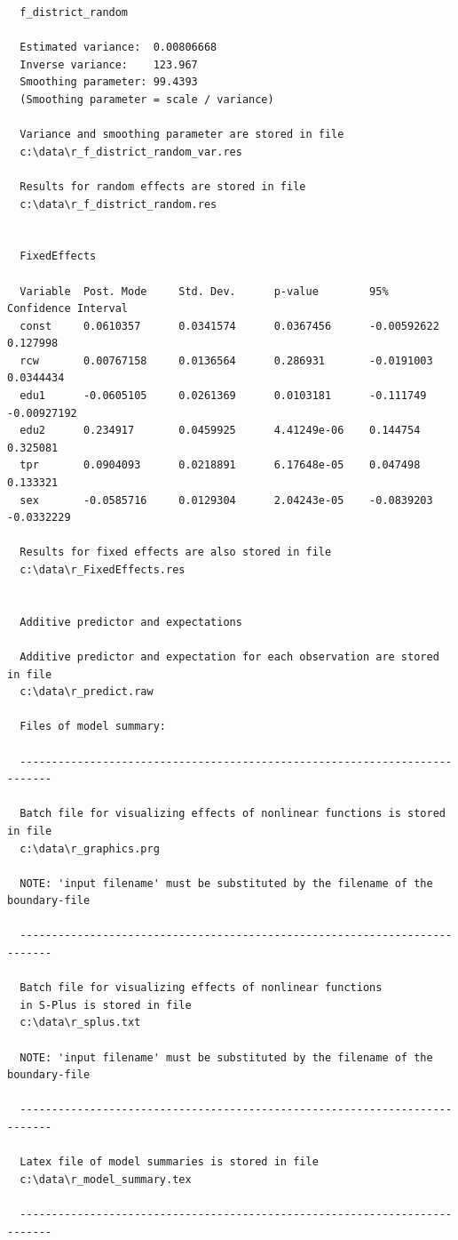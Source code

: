 \documentclass{article}
\begin{document}
\begin{verbatim}
  f_district_random

  Estimated variance:  0.00806668
  Inverse variance:    123.967
  Smoothing parameter: 99.4393
  (Smoothing parameter = scale / variance)

  Variance and smoothing parameter are stored in file
  c:\data\r_f_district_random_var.res

  Results for random effects are stored in file
  c:\data\r_f_district_random.res


  FixedEffects

  Variable  Post. Mode     Std. Dev.      p-value        95% Confidence Interval
  const     0.0610357      0.0341574      0.0367456      -0.00592622    0.127998
  rcw       0.00767158     0.0136564      0.286931       -0.0191003     0.0344434
  edu1      -0.0605105     0.0261369      0.0103181      -0.111749      -0.00927192
  edu2      0.234917       0.0459925      4.41249e-06    0.144754       0.325081
  tpr       0.0904093      0.0218891      6.17648e-05    0.047498       0.133321
  sex       -0.0585716     0.0129304      2.04243e-05    -0.0839203     -0.0332229

  Results for fixed effects are also stored in file
  c:\data\r_FixedEffects.res


  Additive predictor and expectations

  Additive predictor and expectation for each observation are stored in file
  c:\data\r_predict.raw

  Files of model summary:

  ---------------------------------------------------------------------------

  Batch file for visualizing effects of nonlinear functions is stored in file
  c:\data\r_graphics.prg

  NOTE: 'input filename' must be substituted by the filename of the boundary-file

  ---------------------------------------------------------------------------

  Batch file for visualizing effects of nonlinear functions
  in S-Plus is stored in file
  c:\data\r_splus.txt

  NOTE: 'input filename' must be substituted by the filename of the boundary-file

  ---------------------------------------------------------------------------

  Latex file of model summaries is stored in file
  c:\data\r_model_summary.tex

  ---------------------------------------------------------------------------
\end{verbatim}
\normalsize
\end{document}
